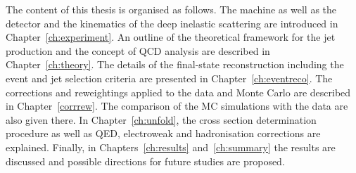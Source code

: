The content of this thesis is organised as follows. The \hera machine as well as the \zeus detector and the kinematics of the deep inelastic scattering are introduced in Chapter~\ref{ch:experiment}. An outline of the theoretical framework for the jet production and the concept of QCD analysis are described in Chapter~\ref{ch:theory}. The details of the final-state reconstruction including the event and jet selection criteria are presented in Chapter~\ref{ch:eventreco}. The corrections and reweightings applied to the data and Monte Carlo are described in Chapter~\ref{corrrew}. The comparison of the MC simulations with the data are also given there. In Chapter~\ref{ch:unfold}, the cross section determination procedure as well as QED, electroweak and hadronisation corrections are explained. Finally, in Chapters~\ref{ch:results} and~\ref{ch:summary} the results are discussed and possible directions for future studies are proposed.